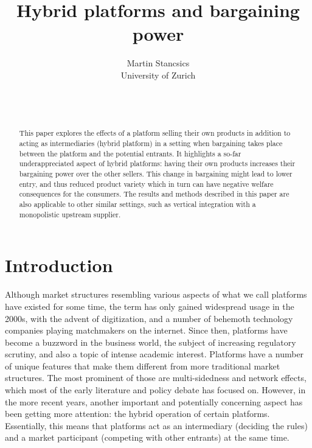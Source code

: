\documentclass[a4paper]{article}
\title{Hybrid platforms and bargaining power}
\author{Martin Stancsics \\ \normalsize{University of Zurich}}
\date{\thisdraft \\ \firstdraft \\ \latestversion}
\begin{document}
\maketitle

\begin{abstract}
    This paper explores the effects of a platform selling their own products in addition to acting as intermediaries (hybrid platform) in a setting when bargaining takes place between the platform and the potential entrants.
    It highlights a so-far underappreciated aspect of hybrid platforms: having their own products increases their bargaining power over the other sellers.
    This change in bargaining might lead to lower entry, and thus reduced product variety which in turn can have negative welfare consequences for the consumers.
    The results and methods described in this paper are also applicable to other similar settings, such as vertical integration with a monopolistic upstream supplier.
\end{abstract}


\section{Introduction}

Although market structures resembling various aspects of what we call platforms have existed for some time, the term has only gained widespread usage in the 2000s, with the advent of digitization, and a number of behemoth technology companies playing matchmakers on the internet.
Since then, platforms have become a buzzword in the business world, the subject of increasing regulatory scrutiny, and also a topic of intense academic interest.
Platforms have a number of unique features that make them different from more traditional market structures.
The most prominent of those are multi-sidedness and network effects, which most of the early literature \parencite[for an overview, see][]{rochet2006two} and policy debate \parencite[e.g.][]{fletcher2021consumer,calvano2021market} has focused on.
However, in the more recent years, another important and potentially concerning aspect has been getting more attention: the hybrid operation of certain platforms.
Essentially, this means that platforms act as an intermediary (deciding the rules) and a market participant (competing with other entrants) at the same time.
\end{document}
